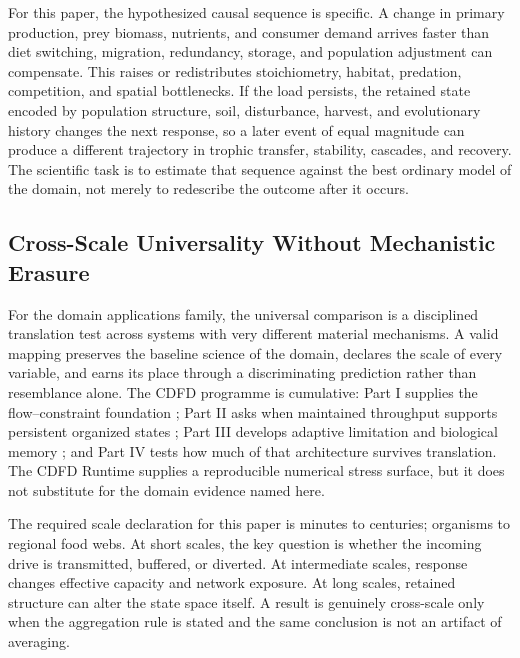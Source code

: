 \documentclass[11pt]{article}
\begin{document}
For this paper, the hypothesized causal sequence is specific. A change in
primary production, prey biomass, nutrients, and consumer demand arrives faster than diet switching, migration, redundancy, storage, and population adjustment can compensate.
This raises or redistributes stoichiometry, habitat, predation, competition, and spatial bottlenecks. If the load persists,
the retained state encoded by population structure, soil, disturbance, harvest, and evolutionary history changes the next response, so a later event of equal
magnitude can produce a different trajectory in trophic transfer, stability, cascades, and recovery. The
scientific task is to estimate that sequence against the best ordinary model of
the domain, not merely to redescribe the outcome after it occurs.

\subsection{Cross-Scale Universality Without Mechanistic Erasure}

For the domain applications family, the universal comparison is a disciplined translation test across systems with very different material mechanisms. A valid mapping preserves the baseline science of the domain, declares the scale of every variable, and earns its place through a discriminating prediction rather than resemblance alone. \cite{Holling1973,Turing1952,Shannon1948,BakTangWiesenfeld1987}
The CDFD programme is cumulative: Part I supplies the flow--constraint
foundation \cite{MujjabiPartI2026}; Part II asks when maintained throughput
supports persistent organized states \cite{MujjabiPartII2026}; Part III
develops adaptive limitation and biological memory \cite{MujjabiPartIII2026};
and Part IV \cite{MujjabiPartIV2026} tests how much of that architecture
survives translation. The CDFD Runtime \cite{CDFDRuntime2026} supplies a
reproducible numerical stress surface, but it does not substitute for the
domain evidence named here.

The required scale declaration for this paper is minutes to centuries; organisms to regional food webs. At short
scales, the key question is whether the incoming drive is transmitted,
buffered, or diverted. At intermediate scales, response changes effective
capacity and network exposure. At long scales, retained structure can alter the
state space itself. A result is genuinely cross-scale only when the aggregation
rule is stated and the same conclusion is not an artifact of averaging.
\end{document}
